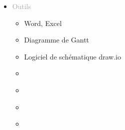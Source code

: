 \documentclass{article}
\begin{document}
\begin{tabular}
\begin{itemize}
        \setlength{\itemsep}{10pt}
        \item \textcolor{darkGray}{Outils}
        \begin{itemize}
        [label={\textcolor{gray!80}{\checkmark}}, topsep=8pt, partopsep=0pt, itemsep=0.5pt, parsep=2pt,after=\vspace*{-\baselineskip}] 
            \item \textcolor{gray!80}{Word, Excel}
            \item \textcolor{gray!80}{Diagramme de Gantt}
            \item \textcolor{gray!80}{Logiciel de schématique draw.io}
            \item[\textcolor{white}{\checkmark}] \textcolor{gray!80}{} %
            \item[\textcolor{white}{\checkmark}] \textcolor{gray!80}{} %
            \item[\textcolor{white}{\checkmark}] \textcolor{gray!80}{} %
            \item[\textcolor{white}{\checkmark}] \textcolor{gray!80}{} %
        \end{itemize}
    \end{itemize}
\end{tabular}

\vfill %


\newpage
\end{document}
